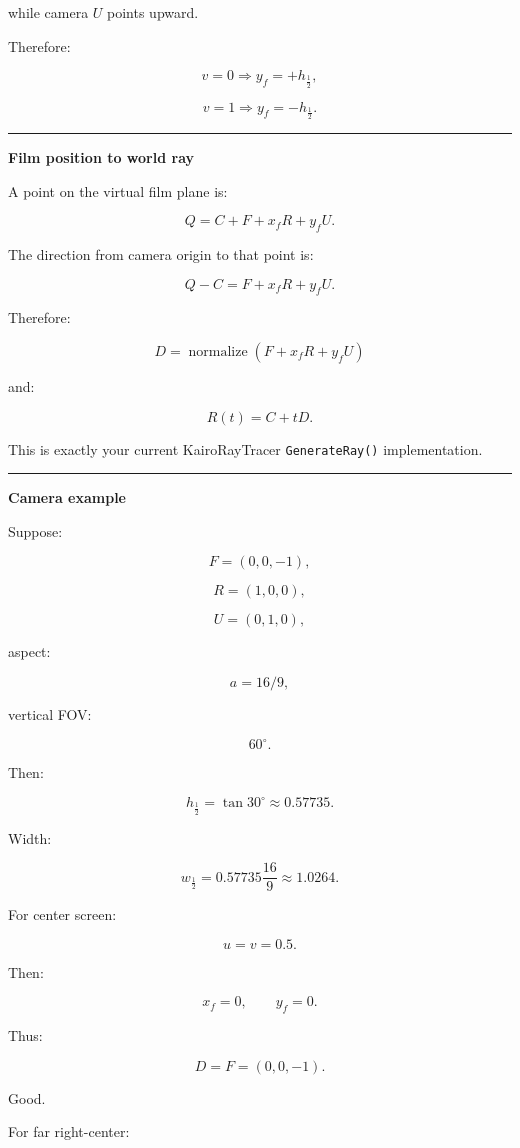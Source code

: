 while camera \(U\) points upward.

Therefore:

\[
v=0
\Rightarrow
y_f=+h_{\frac12},
\]

\[
v=1
\Rightarrow
y_f=-h_{\frac12}.
\]

\begin{center}\rule{0.5\linewidth}{0.5pt}\end{center}

\textbf{Film position to world ray}

A point on the virtual film plane is:

\[
Q=
C+
F+
x_fR+
y_fU.
\]

The direction from camera origin to that point is:

\[
Q-C
=
F+x_fR+y_fU.
\]

Therefore:

\[
\boxed{
D=
\operatorname{normalize}
(
F+x_fR+y_fU
)
}
\]

and:

\[
\boxed{
R(t)=C+tD.
}
\]

This is exactly your current KairoRayTracer \texttt{GenerateRay()} implementation.

\begin{center}\rule{0.5\linewidth}{0.5pt}\end{center}

\textbf{Camera example}

Suppose:

\[
F=(0,0,-1),
\]

\[
R=(1,0,0),
\]

\[
U=(0,1,0),
\]

aspect:

\[
a=16/9,
\]

vertical FOV:

\[
60^\circ.
\]

Then:

\[
h_{\frac12}
=
\tan30^\circ
\approx0.57735.
\]

Width:

\[
w_{\frac12}
=
0.57735\frac{16}{9}
\approx1.0264.
\]

For center screen:

\[
u=v=0.5.
\]

Then:

\[
x_f=0,
\qquad
y_f=0.
\]

Thus:

\[
D=F=(0,0,-1).
\]

Good.

For far right-center:


